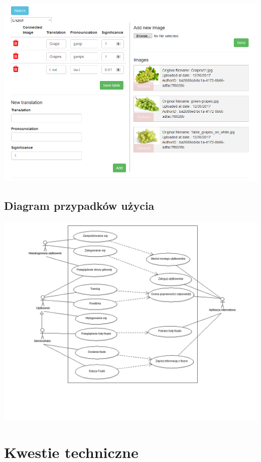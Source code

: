 \begin{center}
	\centering
	\includegraphics[width=\textwidth]{images/Management.png}
\end{center}


\section{Diagram przypadków użycia}

\begin{center}
	\includegraphics[width=\textwidth]{images/usecases.png}
\end{center}


\newpage
{\let\cleardoublepage\relax \chapter{Kwestie techniczne}}

